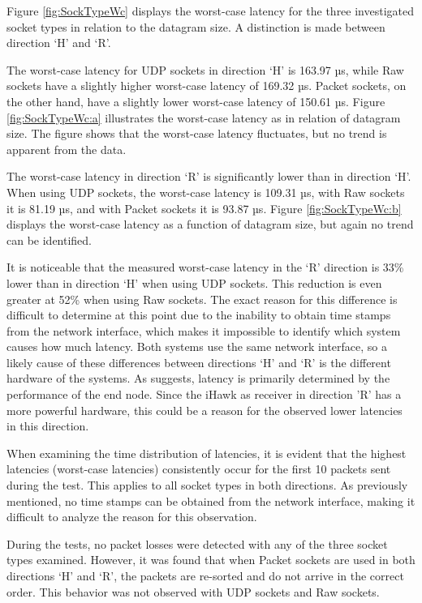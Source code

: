 Figure \ref{fig:SockTypeWc} displays the worst-case latency for the three investigated socket types in relation to the datagram size. A distinction is made between direction `H' and `R'.

The worst-case latency for UDP sockets in direction `H' is 163.97 µs, while Raw sockets have a slightly higher worst-case latency of 169.32 µs. Packet sockets, on the other hand, have a slightly lower worst-case latency of 150.61 µs. Figure \ref{fig:SockTypeWc:a} illustrates the worst-case latency as in relation of datagram size. The figure shows that the worst-case latency fluctuates, but no trend is apparent from the data.

The worst-case latency in direction `R' is significantly lower than in direction `H'. When using UDP sockets, the worst-case latency is 109.31 µs, with Raw sockets it is 81.19 µs, and with Packet sockets it is 93.87 µs. Figure \ref{fig:SockTypeWc:b} displays the worst-case latency as a function of datagram size, but again no trend can be identified.

It is noticeable that the measured worst-case latency in the `R' direction is 33\% lower than in direction `H' when using UDP sockets. This reduction is even greater at 52\% when using Raw sockets. The exact reason for this difference is difficult to determine at this point due to the inability to obtain time stamps from the network interface, which makes it impossible to identify which system causes how much latency. Both systems use the same network interface, so a likely cause of these differences between directions `H' and `R' is the different hardware of the systems. As \cite{perfnew01} suggests, latency is primarily determined by the performance of the end node. Since the iHawk as receiver in direction 'R' has a more powerful hardware, this could be a reason for the observed lower latencies in this direction.

When examining the time distribution of latencies, it is evident that the highest latencies (worst-case latencies) consistently occur for the first 10 packets sent during the test. This applies to all socket types in both directions. As previously mentioned, no time stamps can be obtained from the network interface, making it difficult to analyze the reason for this observation.

During the tests, no packet losses were detected with any of the three socket types examined. However, it was found that when Packet sockets are used in both directions `H' and `R', the packets are re-sorted and do not arrive in the correct order. This behavior was not observed with UDP sockets and Raw sockets.

